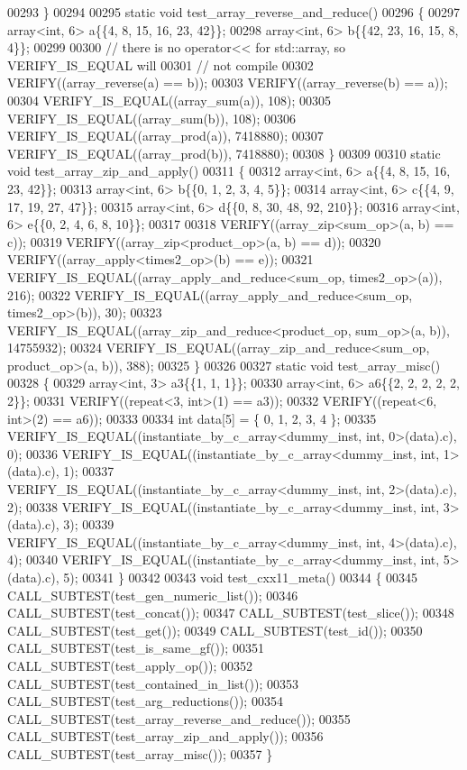 \begin{DoxyCode}
00293 \}
00294 
00295 \textcolor{keyword}{static} \textcolor{keywordtype}{void} test\_array\_reverse\_and\_reduce()
00296 \{
00297   array<int, 6> a\{\{4, 8, 15, 16, 23, 42\}\};
00298   array<int, 6> b\{\{42, 23, 16, 15, 8, 4\}\};
00299 
00300   \textcolor{comment}{// there is no operator<< for std::array, so VERIFY\_IS\_EQUAL will}
00301   \textcolor{comment}{// not compile}
00302   VERIFY((array\_reverse(a) == b));
00303   VERIFY((array\_reverse(b) == a));
00304   VERIFY\_IS\_EQUAL((array\_sum(a)), 108);
00305   VERIFY\_IS\_EQUAL((array\_sum(b)), 108);
00306   VERIFY\_IS\_EQUAL((array\_prod(a)), 7418880);
00307   VERIFY\_IS\_EQUAL((array\_prod(b)), 7418880);
00308 \}
00309 
00310 \textcolor{keyword}{static} \textcolor{keywordtype}{void} test\_array\_zip\_and\_apply()
00311 \{
00312   array<int, 6> a\{\{4, 8, 15, 16, 23, 42\}\};
00313   array<int, 6> b\{\{0, 1, 2, 3, 4, 5\}\};
00314   array<int, 6> c\{\{4, 9, 17, 19, 27, 47\}\};
00315   array<int, 6> d\{\{0, 8, 30, 48, 92, 210\}\};
00316   array<int, 6> e\{\{0, 2, 4, 6, 8, 10\}\};
00317 
00318   VERIFY((array\_zip<sum\_op>(a, b) == c));
00319   VERIFY((array\_zip<product\_op>(a, b) == d));
00320   VERIFY((array\_apply<times2\_op>(b) == e));
00321   VERIFY\_IS\_EQUAL((array\_apply\_and\_reduce<sum\_op, times2\_op>(a)), 216);
00322   VERIFY\_IS\_EQUAL((array\_apply\_and\_reduce<sum\_op, times2\_op>(b)), 30);
00323   VERIFY\_IS\_EQUAL((array\_zip\_and\_reduce<product\_op, sum\_op>(a, b)), 14755932);
00324   VERIFY\_IS\_EQUAL((array\_zip\_and\_reduce<sum\_op, product\_op>(a, b)), 388);
00325 \}
00326 
00327 \textcolor{keyword}{static} \textcolor{keywordtype}{void} test\_array\_misc()
00328 \{
00329   array<int, 3> a3\{\{1, 1, 1\}\};
00330   array<int, 6> a6\{\{2, 2, 2, 2, 2, 2\}\};
00331   VERIFY((repeat<3, int>(1) == a3));
00332   VERIFY((repeat<6, int>(2) == a6));
00333 
00334   \textcolor{keywordtype}{int} data[5] = \{ 0, 1, 2, 3, 4 \};
00335   VERIFY\_IS\_EQUAL((instantiate\_by\_c\_array<dummy\_inst, int, 0>(data).c), 0);
00336   VERIFY\_IS\_EQUAL((instantiate\_by\_c\_array<dummy\_inst, int, 1>(data).c), 1);
00337   VERIFY\_IS\_EQUAL((instantiate\_by\_c\_array<dummy\_inst, int, 2>(data).c), 2);
00338   VERIFY\_IS\_EQUAL((instantiate\_by\_c\_array<dummy\_inst, int, 3>(data).c), 3);
00339   VERIFY\_IS\_EQUAL((instantiate\_by\_c\_array<dummy\_inst, int, 4>(data).c), 4);
00340   VERIFY\_IS\_EQUAL((instantiate\_by\_c\_array<dummy\_inst, int, 5>(data).c), 5);
00341 \}
00342 
00343 \textcolor{keywordtype}{void} test\_cxx11\_meta()
00344 \{
00345   CALL\_SUBTEST(test\_gen\_numeric\_list());
00346   CALL\_SUBTEST(test\_concat());
00347   CALL\_SUBTEST(test\_slice());
00348   CALL\_SUBTEST(test\_get());
00349   CALL\_SUBTEST(test\_id());
00350   CALL\_SUBTEST(test\_is\_same\_gf());
00351   CALL\_SUBTEST(test\_apply\_op());
00352   CALL\_SUBTEST(test\_contained\_in\_list());
00353   CALL\_SUBTEST(test\_arg\_reductions());
00354   CALL\_SUBTEST(test\_array\_reverse\_and\_reduce());
00355   CALL\_SUBTEST(test\_array\_zip\_and\_apply());
00356   CALL\_SUBTEST(test\_array\_misc());
00357 \}
\end{DoxyCode}
